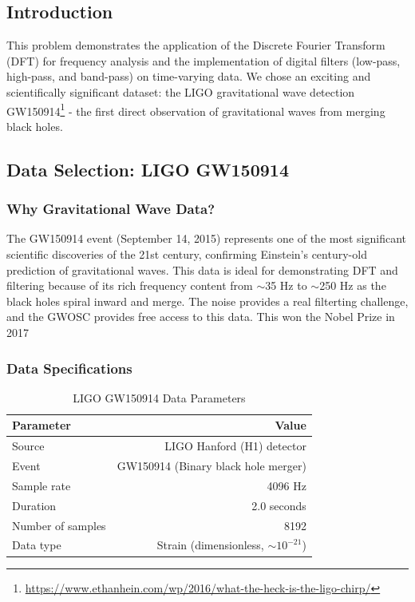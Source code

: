 \documentclass[12pt,a4paper]{article}
\begin{document}
\subsection{Introduction}

This problem demonstrates the application of the Discrete Fourier Transform (DFT) for frequency analysis and the implementation of digital filters (low-pass, high-pass, and band-pass) on time-varying data. We chose an exciting and scientifically significant dataset: the LIGO gravitational wave detection GW150914\footnote{\url{https://www.ethanhein.com/wp/2016/what-the-heck-is-the-ligo-chirp/}} - the first direct observation of gravitational waves from merging black holes.

\subsection{Data Selection: LIGO GW150914}

\subsubsection{Why Gravitational Wave Data?}

The GW150914 event (September 14, 2015) represents one of the most significant scientific discoveries of the 21st century, confirming Einstein's century-old prediction of gravitational waves. This data is ideal for demonstrating DFT and filtering because of its rich frequency content from $\sim$35 Hz to $\sim$250 Hz as the black holes spiral inward and merge. The noise provides a real filterting challenge, and the GWOSC provides free access to this data. This won the Nobel Prize in 2017

\subsubsection{Data Specifications}

\begin{table}[H]
\centering
\caption{LIGO GW150914 Data Parameters}
\label{tab:ligo_data}
\begin{tabular}{@{}lr@{}}
\toprule
\textbf{Parameter} & \textbf{Value} \\
\midrule
Source & LIGO Hanford (H1) detector \\
Event & GW150914 (Binary black hole merger) \\
Sample rate & 4096 Hz \\
Duration & 2.0 seconds \\
Number of samples & 8192 \\
Data type & Strain (dimensionless, $\sim 10^{-21}$) \\
\bottomrule
\end{tabular}
\end{table}
\end{document}
